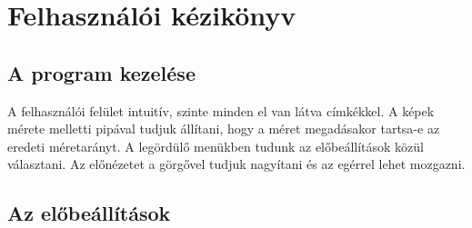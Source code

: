 \chapter{Felhasználói kézikönyv}

\section{A program kezelése}

A felhasználói felület intuitív, szinte minden el van látva címkékkel. A képek mérete melletti pipával tudjuk állítani, hogy a méret megadásakor tartsa-e az eredeti méretarányt. A legördülő menükben tudunk az előbeállítások közül választani. Az előnézetet a görgővel tudjuk nagyítani és az egérrel lehet mozgazni.

\section{Az előbeállítások}

